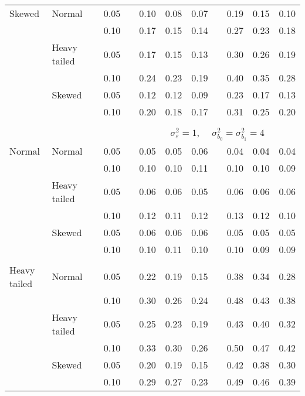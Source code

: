 \begin{table}[ht]
\begin{scriptsize}
\begin{tabular}{ll p{.1cm} c p{.1cm} rrr p{.1cm} rrr}
Skewed       & Normal       && 0.05 &&  0.10 & 0.08 & 0.07 && 0.19 & 0.15 & 0.10 \\ 
             &              && 0.10 &&  0.17 & 0.15 & 0.14 && 0.27 & 0.23 & 0.18 \\ 
             & Heavy tailed && 0.05 &&  0.17 & 0.15 & 0.13 && 0.30 & 0.26 & 0.19 \\ 
             &              && 0.10 &&  0.24 & 0.23 & 0.19 && 0.40 & 0.35 & 0.28 \\ 
             & Skewed       && 0.05 &&  0.12 & 0.12 & 0.09 && 0.23 & 0.17 & 0.13 \\ 
             &              && 0.10 &&  0.20 & 0.18 & 0.17 && 0.31 & 0.25 & 0.20 \\ 


&&&&&&&&&&&\\
& && && \multicolumn{7}{c}{$\sigma_{\varepsilon}^2 = 1$, \ \ $\sigma_{b_0}^2 = \sigma_{b_1}^2 = 4$} \\ \cline{6-12}
\rowcolor{gray!20}Normal       & Normal       && 0.05 &&  0.05 & 0.05 & 0.06 && 0.04 & 0.04 & 0.04 \\ 
\rowcolor{gray!20}             &              && 0.10 &&  0.10 & 0.10 & 0.11 && 0.10 & 0.10 & 0.09 \\ 
\rowcolor{gray!20}             & Heavy tailed && 0.05 &&  0.06 & 0.06 & 0.05 && 0.06 & 0.06 & 0.06 \\ 
\rowcolor{gray!20}             &              && 0.10 &&  0.12 & 0.11 & 0.12 && 0.13 & 0.12 & 0.10 \\ 
\rowcolor{gray!20}             & Skewed       && 0.05 &&  0.06 & 0.06 & 0.06 && 0.05 & 0.05 & 0.05 \\ 
\rowcolor{gray!20}             &              && 0.10 &&  0.10 & 0.11 & 0.10 && 0.10 & 0.09 & 0.09 \\ 
 &&&&&&&&&&&\\
Heavy tailed & Normal       && 0.05 &&  0.22 & 0.19 & 0.15 && 0.38 & 0.34 & 0.28 \\ 
             &              && 0.10 &&  0.30 & 0.26 & 0.24 && 0.48 & 0.43 & 0.38 \\ 
             & Heavy tailed && 0.05 &&  0.25 & 0.23 & 0.19 && 0.43 & 0.40 & 0.32 \\ 
             &              && 0.10 &&  0.33 & 0.30 & 0.26 && 0.50 & 0.47 & 0.42 \\ 
             & Skewed       && 0.05 &&  0.20 & 0.19 & 0.15 && 0.42 & 0.38 & 0.30 \\ 
             &              && 0.10 &&  0.29 & 0.27 & 0.23 && 0.49 & 0.46 & 0.39 \\ 

\end{tabular}
\end{scriptsize}
\end{table}
